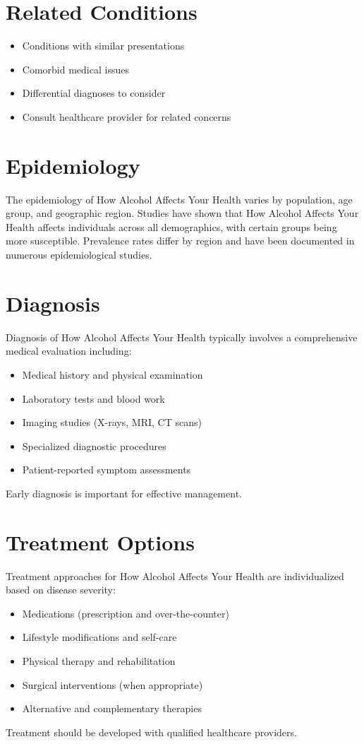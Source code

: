 \section*{Related Conditions}
\begin{itemize}
  \item Conditions with similar presentations
  \item Comorbid medical issues
  \item Differential diagnoses to consider
  \item Consult healthcare provider for related concerns
\end{itemize}

\section*{Epidemiology}
The epidemiology of How Alcohol Affects Your Health varies by population, age group, and geographic region. Studies have shown that How Alcohol Affects Your Health affects individuals across all demographics, with certain groups being more susceptible. Prevalence rates differ by region and have been documented in numerous epidemiological studies.

\section*{Diagnosis}
Diagnosis of How Alcohol Affects Your Health typically involves a comprehensive medical evaluation including:
\begin{itemize}
  \item Medical history and physical examination
  \item Laboratory tests and blood work
  \item Imaging studies (X-rays, MRI, CT scans)
  \item Specialized diagnostic procedures
  \item Patient-reported symptom assessments
\end{itemize}
Early diagnosis is important for effective management.

\section*{Treatment Options}
Treatment approaches for How Alcohol Affects Your Health are individualized based on disease severity:
\begin{itemize}
  \item Medications (prescription and over-the-counter)
  \item Lifestyle modifications and self-care
  \item Physical therapy and rehabilitation
  \item Surgical interventions (when appropriate)
  \item Alternative and complementary therapies
\end{itemize}
Treatment should be developed with qualified healthcare providers.


